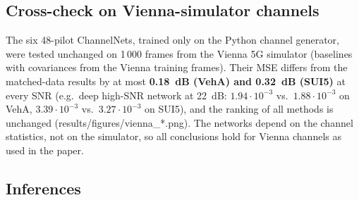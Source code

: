 \documentclass[10pt,a4paper]{article}
\begin{document}
\subsection{Cross-check on Vienna-simulator channels}
\label{sec:vienna}

The six 48-pilot ChannelNets, trained only on the Python channel generator, were tested unchanged on 1\,000
frames from the Vienna 5G simulator (baselines with covariances from the Vienna training frames). Their MSE
differs from the matched-data results by at most \textbf{0.18~dB (VehA) and 0.32~dB (SUI5)} at every SNR
(e.g.\ deep high-SNR network at 22~dB: $1.94\cdot10^{-3}$ vs.\ $1.88\cdot10^{-3}$ on VehA,
$3.39\cdot10^{-3}$ vs.\ $3.27\cdot10^{-3}$ on SUI5), and the ranking of all methods is unchanged
({results/figures/vienna\_*.png}). The networks depend on the channel statistics, not on the
simulator, so all conclusions hold for Vienna channels as used in the paper.

\subsection{Inferences}
\end{document}
